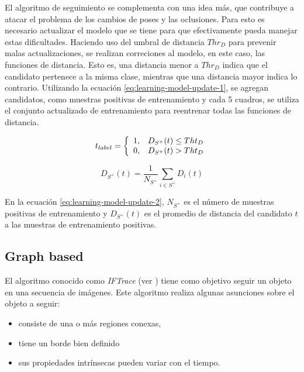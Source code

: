 \documentclass[a4paper,10pt]{article}
\begin{document}
El algoritmo de seguimiento se complementa con una idea más, que
contribuye a atacar el problema de los cambios de poses y las oclusiones.
Para esto es necesario actualizar el modelo que se tiene para
que efectivamente pueda manejar estas dificultades.
Haciendo uso del umbral de distancia $Thr_{D}$ para prevenir
malas actualizaciones, se realizan correciones al modelo,
en este caso, las funciones de distancia. Esto es, una distancia
menor a $Thr_{D}$ indica que el candidato pertenece a la misma clase,
mientras que una distancia mayor indica lo contrario. Utilizando
la ecuación \ref{eq:learning-model-update-1}, se agregan candidatos,
como muestras positivas de entrenamiento y cada 5 cuadros,
se utiliza el conjunto actualizado de entrenamiento para
reentrenar todas las funciones de distancia.

\begin{equation}
    \label{eq:learning-model-update-1}
    t_{label} = \left\{
                \begin{array}{l l}
                    1, & D_{S^{+}}(t) \leq Tht_{D}\\
                    0, & D_{S^{+}}(t) >  Tht_{D}
                \end{array} \right.
\end{equation}

\begin{equation}
    \label{eq:learning-model-update-2}
    D_{S^{+}}(t) = \dfrac{1}{N_{S^{+}}} \sum_{i \in S^{+}} D_{i}(t)
\end{equation}

En la ecuación \ref{eq:learning-model-update-2}, $N_{S^{+}}$ es el
número de muestras positivas de entrenamiento y $D_{S^{+}}(t)$
es el promedio de distancia del candidato $t$ a las muestras
de entrenamiento positivas.

\subsection{Graph based}

El algoritmo conocido como \textit{IFTrace} (ver \cite{IFTrace}) tiene como objetivo
seguir un objeto en una secuencia de imágenes. Este algoritmo realiza algunas
asunciones sobre el objeto a seguir:

\begin{itemize}
    \item consiste de una o más regiones conexas,
    \item tiene un borde bien definido
    \item sus propiedades intrínsecas pueden variar con el tiempo.
\end{itemize}
\end{document}
